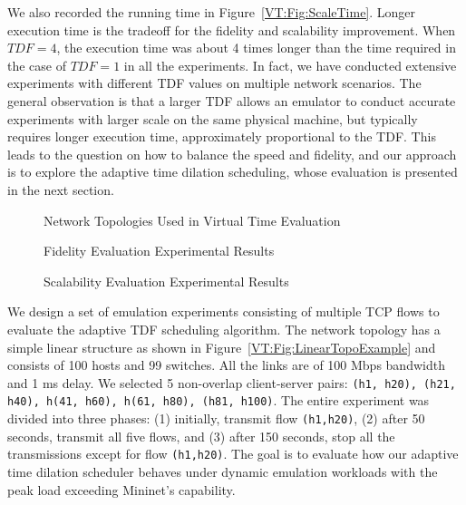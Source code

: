 We also recorded the running time in Figure~\ref{VT:Fig:ScaleTime}.
Longer execution time is the tradeoff for the fidelity and scalability improvement.
When $TDF=4$, the execution time was about 4 times longer than the time required in the case of $TDF=1$ in all the experiments.
In fact, we have conducted extensive experiments with different TDF values on multiple network scenarios.
The general observation is that a larger TDF allows an emulator to conduct accurate experiments with larger scale on the same physical machine,
but typically requires longer execution time, approximately proportional to the TDF.
This leads to the question on how to balance the speed and fidelity,
and our approach is to explore the adaptive time dilation scheduling, whose evaluation is presented in the next section. 

\begin{figure}
    \centering
    \caption{Network Topologies Used in Virtual Time Evaluation}
\end{figure}

\begin{figure}
    \centering
    \caption{Fidelity Evaluation Experimental Results}
\end{figure}

\begin{figure}
    \centering
    \caption{Scalability Evaluation Experimental Results}
\end{figure}

We design a set of emulation experiments consisting of multiple TCP flows to evaluate the adaptive TDF scheduling algorithm.
The network topology has a simple linear structure as shown in Figure~\ref{VT:Fig:LinearTopoExample} and consists of 100 hosts and 99 switches.
All the links are of 100 Mbps bandwidth and 1 ms delay.
We selected 5 non-overlap client-server pairs: \texttt{(h1, h20), (h21, h40), h(41, h60), h(61, h80), (h81, h100)}.
The entire experiment was divided into three phases: (1) initially, transmit flow \texttt{(h1,h20)},
(2) after 50 seconds, transmit all five flows, and (3) after 150 seconds, stop all the transmissions except for flow \texttt{(h1,h20)}.
The goal is to evaluate how our adaptive time dilation scheduler behaves under dynamic emulation workloads with the peak load exceeding Mininet's capability.

